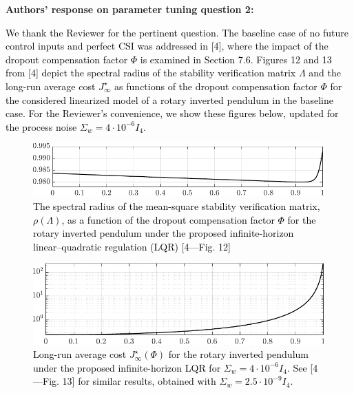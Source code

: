 \textbf{Authors' response on parameter tuning question 2:} \textcolor{black}{We thank the Reviewer for the pertinent question. The baseline case of no future control inputs and perfect CSI was addressed in [4], where the impact of the dropout compensation factor $\mathit{\Phi}$ is examined in Section 7.6. Figures 12 and 13 from [4] depict the spectral radius of the stability verification matrix $\mathit{\Lambda}$ and the long-run average cost $J_{\infty}^{\star}$ as functions of the dropout compensation factor $\mathit{\Phi}$ for the considered linearized model of a rotary inverted pendulum in the baseline case. For the Reviewer's convenience, we show these figures below, updated for the process noise $\Sigma_{w}=4\cdot 10^{-6} I_4$. \\
\begin{figure}[h!]
\begin{center}
\includegraphics[width=0.7\columnwidth]{./responses-rev-1/stability-cntrl-2.pdf}
\caption{The spectral radius of the mean-square stability verification matrix, $\rho(\mathit{\Lambda})$, as a function of the dropout compensation factor $\mathit{\Phi}$ for the rotary inverted pendulum under the proposed infinite-horizon linear–quadratic regulation (LQR) [4—Fig. 12]}\label{fig:stability-coeff}
\end{center}
\end{figure}
\begin{figure}[h!]
\begin{center}
\includegraphics[width=0.7\columnwidth]{./responses-rev-1/cost-cntrl-2.pdf}
\caption{Long-run average cost $J_{\infty}^{\star}(\mathit{\Phi})$ for the rotary inverted pendulum under the proposed infinite-horizon LQR for $\Sigma_{w}=4\cdot 10^{-6} I_4$. See [4—Fig. 13] for similar results, obtained with $\Sigma_{w}=2.5\cdot 10^{-9} I_4$.}\label{fig:cost-coeff}
\end{center}
\end{figure}
\begin{figure}[h!]
\begin{center}

\end{center}
\end{figure}}
